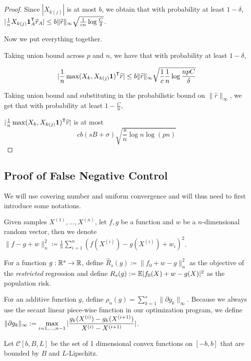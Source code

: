 \begin{proof}
Since $|X_{k(j)}|$ is at most $b$, we obtain that with probability at least $1-\delta$, $| \frac{1}{n} X_{k(j)} \mbox{\boldmath $1$}_A^{\mathsf{T}} \widehat{r}_A| \leq b\| \widehat{r} \|_\infty \sqrt{ \frac{1}{cn} \log \frac{C}{\delta}}$.

Now we put everything together.

Taking union bound across $p$ and $n$, we have that with probability at least $1-\delta$, 

\[
| \frac{1}{n} \max(X_k, X_{k(j)}\mbox{\boldmath $1$})^{\mathsf{T}} \widehat{r}| \leq b \|\widehat{r}\|_\infty \sqrt{ \frac{1}{c} \frac{1}{n} \log \frac{np C }{\delta}}
\]

Taking union bound and substituting in the probabilistic bound on $\|\hat{r}\|_\infty$, we get that with probability at least $1-\frac{C}{n}$,

$| \frac{1}{n} \max(X_k, X_{k(j)}\mbox{\boldmath $1$})^{\mathsf{T}} \widehat{r}|$ is at most 
\[
 c b (sB + \sigma) \sqrt{ \frac{s}{n} \log n \log (pn) }
\]

\end{proof}

 
 
 
 
 
 \subsection{Proof of False Negative Control}
 \label{sec:false_negative_proof}
 
 We will use covering number and uniform convergence and will thus need to first introduce some notations. 
 
 Given samples $X^{(1)},...,X^{(n)}$, let $f, g$ be a function and $w$ be a $n$-dimensional random vector, then we denote $\| f - g + w \|_n^2 \coloneqq \frac{1}{n} \sum_{i=1}^n ( f(X^{(i)}) - g(X^{(i)}) + w_i )^2$.

For a function $g : {\mathbb R}^s \rightarrow {\mathbb R}$, define $\hat{R}_s(g) \coloneqq \| f_0 + w - g \|_n^2$ as the objective of the \emph{restricted} regression and define $R_s(g) := {\mathbb E} | f_0(X)  + w - g(X) |^2$ as the population risk.

For an additive function $g$, define $\rho_n(g) = \sum_{k=1}^s \| \partial g_k \|_\infty$. Because we always use the secant linear piece-wise function in our optimization program, we define $\displaystyle \| \partial g_k\|_\infty := \max_{i=1,...,n-1} |\frac{ g_k(X^{(i)}) - g_k(X^{(i+1)})}{ X^{(i)} - X^{(i+1)}}|$.

Let $\mathcal{C}[b,B,L]$ be the set of 1 dimensional convex functions on $[-b,b]$ that are bounded by $B$ and $L$-Lipschitz.

